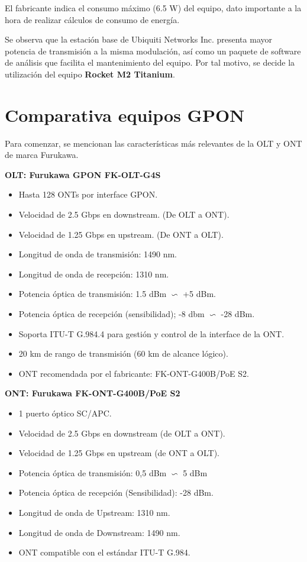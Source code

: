 \documentclass[12pt,a4paper]{book}
\begin{document}
El fabricante indica el consumo máximo (6.5 W) del equipo, dato importante a la hora de realizar cálculos de consumo de energía.

\medskip

Se observa que la estación base de Ubiquiti Networks Inc. presenta mayor potencia de transmisión a la misma modulación, así como un paquete de software de análisis que facilita el mantenimiento del equipo. Por tal motivo, se decide la utilización del equipo \textbf{Rocket M2 Titanium}.







\chapter{Comparativa equipos GPON} \label{ane_comp_equipos_gpon_acceso}

Para comenzar, se mencionan las características más relevantes de la OLT
y ONT de marca Furukawa.\bigskip

\textbf{OLT: Furukawa GPON FK-OLT-G4S}\medskip
\begin{itemize}
\item Hasta 128 ONTs por interface GPON.
\item Velocidad de 2.5 Gbps en downstream. (De OLT a ONT).
\item Velocidad de 1.25 Gbps en upstream. (De ONT a OLT).
\item Longitud de onda de transmisión: 1490 nm.
\item Longitud de onda de recepción: 1310 nm.
\item Potencia óptica de transmisión: 1.5 dBm $\backsim$ +5 dBm.
\item Potencia óptica de recepción (sensibilidad); -8 dbm $\backsim$ -28 dBm.
\item Soporta ITU-T G.984.4 para gestión y control de la interface de la ONT.
\item 20 km de rango de transmisión (60 km de alcance lógico).
\item ONT recomendada por el fabricante: FK-ONT-G400B/PoE S2.
\end{itemize} \bigskip

\textbf{ONT: Furukawa FK-ONT-G400B/PoE S2}\medskip
\begin{itemize}
\item 1 puerto óptico SC/APC.
\item Velocidad de 2.5 Gbps en downstream (de OLT a ONT).
\item Velocidad de 1.25 Gbps en upstream (de ONT a OLT).
\item Potencia óptica de transmisión: 0,5 dBm $\backsim$ 5 dBm
\item Potencia óptica de recepción (Sensibilidad): -28 dBm.
\item Longitud de onda de Upstream: 1310 nm.
\item Longitud de onda de Downstream: 1490 nm.
\item ONT compatible con el estándar ITU-T G.984.
\end{itemize}\bigskip
\end{document}
